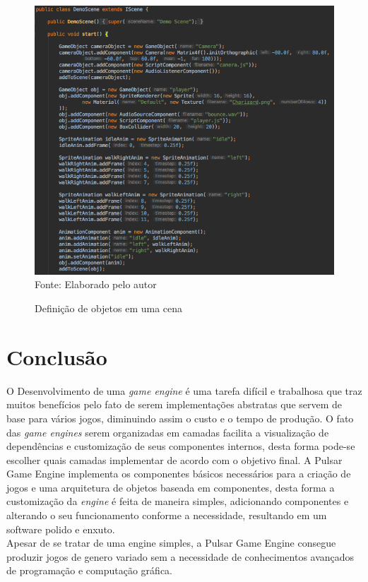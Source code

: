 \documentclass[12pt,	openright, twoside,	a4paper, english, french, spanish, brazil]{abntex2}
\begin{document}
\begin{figure}[H]
\centering
\caption{Definição de objetos em uma cena}
\includegraphics[width=12cm]{imagens/custom-scene.png}
\\
\small{Fonte: Elaborado pelo autor}
\label{figura:custom-scene}
\end{figure}

%
%

\chapter{Conclusão} \label{cap: conclusao}


O Desenvolvimento de uma \textit{game engine} é uma tarefa difícil e trabalhosa que traz muitos benefícios pelo fato de serem implementações abstratas que servem de base para vários jogos, diminuindo assim o custo e o tempo de produção. O fato das \textit{game engines} serem organizadas em camadas facilita a visualização de dependências e customização de seus componentes internos, desta forma pode-se escolher quais camadas implementar de acordo com o objetivo final. A Pulsar Game Engine implementa os componentes básicos necessários para a criação de jogos e uma arquitetura de objetos baseada em componentes, desta forma a customização da \textit{engine} é feita de maneira simples, adicionando componentes e alterando o seu funcionamento conforme a necessidade, resultando em um software polido e enxuto. \\
Apesar de se tratar de uma engine simples, a Pulsar Game Engine consegue produzir jogos de genero variado sem a necessidade de conhecimentos avançados de programação e computação gráfica.
\end{document}
